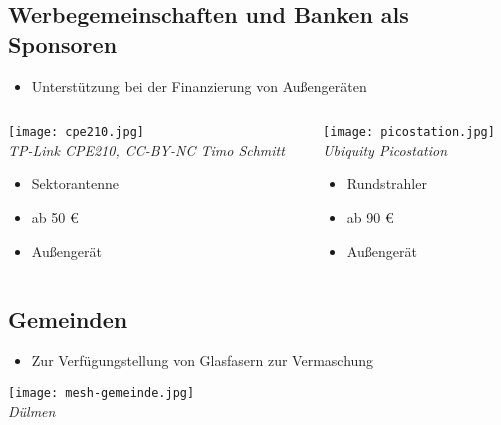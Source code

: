 \documentclass{beamer}
\begin{document}
\subsection{Werbegemeinschaften und Banken als Sponsoren}
\begin{frame}
	\begin{itemize}
		\item Unterstützung bei der Finanzierung von Außengeräten
	\end{itemize}
	\begin{columns}
		\begin{column}{0.45\textwidth}
			\texttt{[image: cpe210.jpg]}\\
			\vspace*{-2.0mm}\textit{\tiny TP-Link CPE210, CC-BY-NC Timo Schmitt}
			\begin{itemize}
				\item Sektorantenne 
				\item ab 50 \euro
				\item Außengerät
			\end{itemize}

			
		\end{column}
		\begin{column}{0.45\textwidth}
			\texttt{[image: picostation.jpg]}\\
			\vspace*{-2.0mm}\textit{\tiny Ubiquity Picostation}
			\begin{itemize}
				\item Rundstrahler
				\item ab 90 \euro
				\item Außengerät
			\end{itemize}
			
		\end{column}
	\end{columns}
\end{frame}
\subsection{Gemeinden}
\begin{frame}
	\begin{itemize}
		\item Zur Verfügungstellung von Glasfasern zur Vermaschung
	\end{itemize}
	\begin{center}
		\texttt{[image: mesh-gemeinde.jpg]}\\\vspace*{-2mm}\textit{\tiny\bigskip Dülmen}
	\end{center}
\end{frame}
\end{document}
